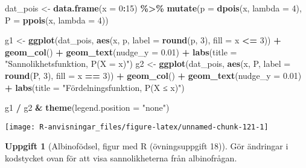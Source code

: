 \documentclass[
]{book}
\newenvironment{Shaded}{\begin{snugshade}}{\end{snugshade}}
\newcommand{\AttributeTok}[1]{\textcolor[rgb]{0.13,0.29,0.53}{#1}}
\newcommand{\DecValTok}[1]{\textcolor[rgb]{0.00,0.00,0.81}{#1}}
\newcommand{\FloatTok}[1]{\textcolor[rgb]{0.00,0.00,0.81}{#1}}
\newcommand{\FunctionTok}[1]{\textcolor[rgb]{0.13,0.29,0.53}{\textbf{#1}}}
\newcommand{\NormalTok}[1]{#1}
\newcommand{\OtherTok}[1]{\textcolor[rgb]{0.56,0.35,0.01}{#1}}
\newcommand{\SpecialCharTok}[1]{\textcolor[rgb]{0.81,0.36,0.00}{\textbf{#1}}}
\newcommand{\StringTok}[1]{\textcolor[rgb]{0.31,0.60,0.02}{#1}}
\theoremstyle{definition}
\theoremstyle{definition}
\theoremstyle{definition}
\newtheorem{exercise}{Uppgift}[chapter]
\theoremstyle{definition}
\theoremstyle{remark}
\begin{document}
\begin{Shaded}
\begin{Highlighting}[]
\NormalTok{dat\_pois }\OtherTok{\textless{}{-}} \FunctionTok{data.frame}\NormalTok{(}\AttributeTok{x =} \DecValTok{0}\SpecialCharTok{:}\DecValTok{15}\NormalTok{) }\SpecialCharTok{\%\textgreater{}\%} 
  \FunctionTok{mutate}\NormalTok{(}\AttributeTok{p =} \FunctionTok{dpois}\NormalTok{(x, }\AttributeTok{lambda =} \DecValTok{4}\NormalTok{),}
         \AttributeTok{P =} \FunctionTok{ppois}\NormalTok{(x, }\AttributeTok{lambda =} \DecValTok{4}\NormalTok{))}

\NormalTok{g1 }\OtherTok{\textless{}{-}} \FunctionTok{ggplot}\NormalTok{(dat\_pois, }\FunctionTok{aes}\NormalTok{(x, p, }\AttributeTok{label =} \FunctionTok{round}\NormalTok{(p, }\DecValTok{3}\NormalTok{), }\AttributeTok{fill =}\NormalTok{ x }\SpecialCharTok{\textless{}=} \DecValTok{3}\NormalTok{)) }\SpecialCharTok{+} 
  \FunctionTok{geom\_col}\NormalTok{() }\SpecialCharTok{+} 
  \FunctionTok{geom\_text}\NormalTok{(}\AttributeTok{nudge\_y =} \FloatTok{0.01}\NormalTok{) }\SpecialCharTok{+}
  \FunctionTok{labs}\NormalTok{(}\AttributeTok{title =} \StringTok{"Sannolikhetsfunktion, P(X = x)"}\NormalTok{)}
\NormalTok{g2 }\OtherTok{\textless{}{-}} \FunctionTok{ggplot}\NormalTok{(dat\_pois, }\FunctionTok{aes}\NormalTok{(x, P, }\AttributeTok{label =} \FunctionTok{round}\NormalTok{(P, }\DecValTok{3}\NormalTok{), }\AttributeTok{fill =}\NormalTok{ x }\SpecialCharTok{==} \DecValTok{3}\NormalTok{)) }\SpecialCharTok{+} 
  \FunctionTok{geom\_col}\NormalTok{() }\SpecialCharTok{+} 
  \FunctionTok{geom\_text}\NormalTok{(}\AttributeTok{nudge\_y =} \FloatTok{0.01}\NormalTok{) }\SpecialCharTok{+}
  \FunctionTok{labs}\NormalTok{(}\AttributeTok{title =} \StringTok{"Fördelningsfunktion, P(X ≤ x)"}\NormalTok{)}

\NormalTok{g1 }\SpecialCharTok{/}\NormalTok{ g2 }\SpecialCharTok{\&} \FunctionTok{theme}\NormalTok{(}\AttributeTok{legend.position =} \StringTok{"none"}\NormalTok{)}
\end{Highlighting}
\end{Shaded}

\begin{center}\texttt{[image: R-anvisningar\_files/figure-latex/unnamed-chunk-121-1]} \end{center}

\begin{exercise}[Albinofödsel, figur med R (övningsuppgift 18)]
Gör ändringar i kodstycket ovan för att visa sannolikheterna från albinofrågan.
\end{exercise}
\end{document}
